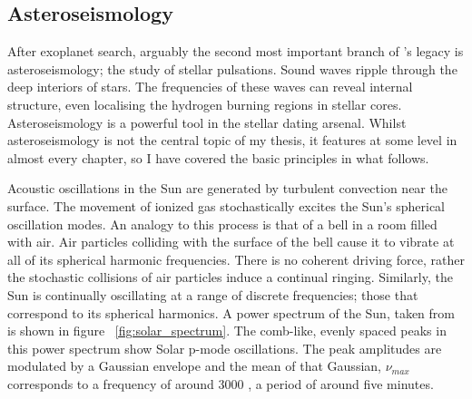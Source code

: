 
\subsection{Asteroseismology}

After exoplanet search, arguably the second most important branch of \kepler's
legacy is asteroseismology; the study of stellar pulsations.
Sound waves ripple through the deep interiors of stars.
The frequencies of these waves can reveal internal structure, even localising
the hydrogen burning regions in stellar cores.
Asteroseismology is a powerful tool in the stellar dating arsenal.
Whilst asteroseismology is not the central topic of my thesis, it features at
some level in almost every chapter, so I have covered the basic principles in
what follows.

Acoustic oscillations in the Sun are generated by turbulent convection near
the surface.
The movement of ionized gas stochastically excites the Sun's spherical
oscillation modes.
An analogy to this process is that of a bell in a room filled with air.
Air particles colliding with the surface of the bell cause it to vibrate at
all of its spherical harmonic frequencies.
There is no coherent driving force, rather the stochastic collisions of air
particles induce a continual ringing.
Similarly, the Sun is continually oscillating at a range of discrete
frequencies; those that correspond to its spherical harmonics.
A power spectrum of the Sun, taken from \citet{brown} is shown in figure
~\ref{fig:solar_spectrum}.
The comb-like, evenly spaced peaks in this power spectrum show Solar p-mode
oscillations.
The peak amplitudes are modulated by a Gaussian envelope and the mean of that
Gaussian, $\nu_{max}$ corresponds to a frequency of around 3000 \uHz, a period
of around five minutes.

